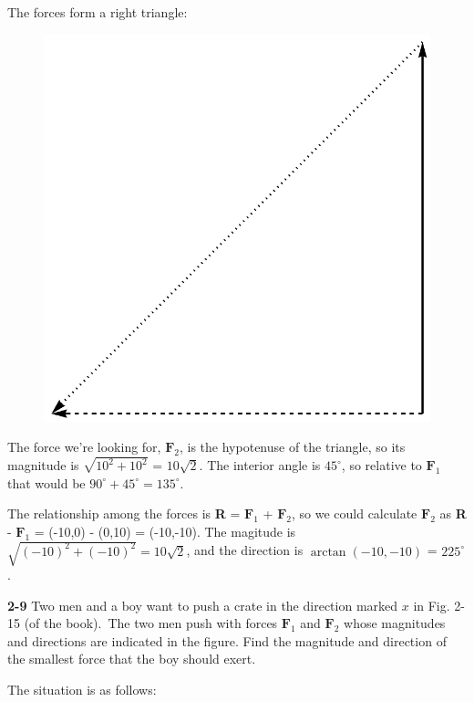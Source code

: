 \documentclass{amsart}
\begin{document}
The forces form a right triangle:

\begin{figure}[h]
\includegraphics[scale=0.3]{2-8}
\end{figure}

The force we're looking for, $\textbf{F}_2$, is the hypotenuse of the triangle,
so its magnitude is $\sqrt{10^2 + 10^2}$ = $10\sqrt{2}$.
The interior angle is $45^\circ$, so relative to $\textbf{F}_1$ that would be $90^\circ + 45^\circ = 135^\circ$.

The relationship among the forces is \textbf{R} = $\textbf{F}_1$ + $\textbf{F}_2$,
so we could calculate $\textbf{F}_2$ as \textbf{R} - $\textbf{F}_1$ = (-10,0) - (0,10) = (-10,-10).
The magitude is $\sqrt{(-10)^2+(-10)^2} = 10\sqrt{2}$,
and the direction is $\arctan(-10,-10)$ = $225^\circ$.

\vspace{\baselineskip}
\noindent
\textbf{2-9} Two men and a boy want to push a crate in the direction marked $x$ in Fig. 2-15 (of the book).\
The two men push with forces $\textbf{F}_1$ and $\textbf{F}_2$ whose magnitudes and directions are indicated
in the figure.
Find the magnitude and direction of the smallest force that the boy should exert.

\clearpage
The situation is as follows:
\end{document}
